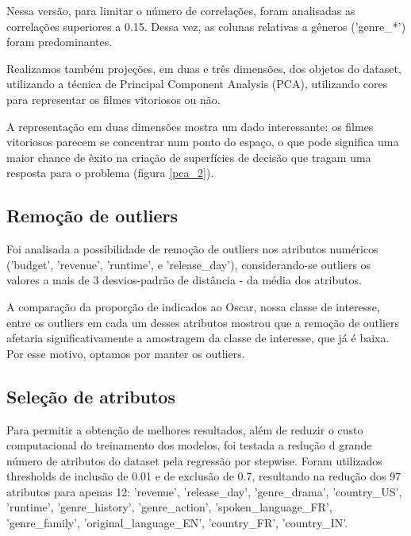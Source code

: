         Nessa versão, para limitar o número de correlações, foram analisadas as correlações superiores a 0.15. Dessa vez, as colunas relativas a gêneros ('genre\_*') foram predominantes.

        Realizamos também projeções, em duas e três dimensões, dos objetos do dataset, utilizando a técnica de Principal Component Analysis (PCA), utilizando cores para representar os filmes vitoriosos ou não.
        
        A representação em duas dimensões mostra um dado interessante: os filmes vitoriosos parecem se concentrar num ponto do espaço, o que pode significa uma maior chance de êxito na criação de superfícies de decisão que tragam uma resposta para o problema (figura \ref{pca_2}).
        
        \subsection{Remoção de outliers}\par
        Foi analisada a possibilidade de remoção de outliers nos atributos numéricos ('budget', 'revenue', 'runtime', e 'release\_day'), considerando-se outliers os valores a mais de 3 desvios-padrão de distância - da média dos atributos.\par
        
        A comparação da proporção de indicados ao Oscar, nossa classe de interesse, entre os outliers em cada um desses atributos mostrou que a remoção de outliers afetaria significativamente a amostragem da classe de interesse, que já é baixa. Por esse motivo, optamos por manter os outliers.

        \subsection{Seleção de atributos}\par
        
        Para permitir a obtenção de melhores resultados, além de reduzir o custo computacional do treinamento dos modelos, foi testada a redução d grande número de atributos do dataset pela regressão por stepwise. Foram utilizados thresholds de inclusão de 0.01 e de exclusão de 0.7, resultando na redução dos 97 atributos para apenas 12: 'revenue', 'release\_day', 'genre\_drama', 'country\_US', 'runtime', 'genre\_history', 'genre\_action', 'spoken\_language\_FR', 'genre\_family', 'original\_language\_EN', 'country\_FR', 'country\_IN'.
        
